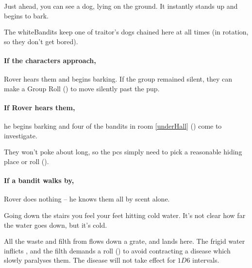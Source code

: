 \begin{boxtext}

  Just ahead, you can see a dog, lying on the ground.
  It instantly stands up and begins to bark.

\end{boxtext}

\begin{exampletext}
  The \gls{whiteBandits} keep one of \gls{traitor}'s dogs chained here at all times (in rotation, so they don't get bored).
\end{exampletext}

\paragraph{If the characters approach,}
Rover hears them and begins barking.
If the group remained silent, they can make a  Group Roll (\tn[9]) to move silently past the pup.

\paragraph{If Rover hears them,}
he begins barking and four of the bandits in room \ref{underHall} () come to investigate.

They won't poke about long, so the \glspl{pc} simply need to pick a reasonable hiding place or roll  (\tn[8]).

\paragraph{If a bandit walks by,}
Rover does nothing -- he knows them all by scent alone.


\begin{boxtext}
  Going down the stairs you feel your feet hitting cold water.
  It's not clear how far the water goes down, but it's cold.
\end{boxtext}


All the waste and filth from  flows down a grate, and lands here.
The frigid water inflicts , and the filth demands a  roll (\tn[10]) to avoid contracting a disease which slowly paralyses them.%
The disease will not take effect for $1D6$ \glspl{interval}.

